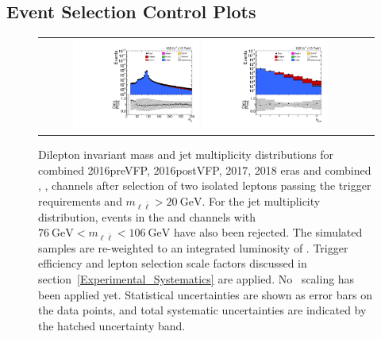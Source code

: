 \subsection{Event Selection Control Plots}
\begin{figure}[htb]
    \begin{center}
        \begin{tabular}{cc}
            \includegraphics[width=0.40\textwidth]{fig_fullRun2UL/controlplots/combined/DIMFull.pdf}
            \includegraphics[width=0.40\textwidth]{fig_fullRun2UL/controlplots/combined/HypjetMulti_diLep.pdf}
        \end{tabular}
        \caption{\footnotesize Dilepton invariant mass and jet multiplicity distributions for combined 2016preVFP, 2016postVFP, 2017, 2018 eras and combined \ee, \emu, \mumu channels after selection of two isolated leptons passing the trigger requirements and $m_{\ell\bar{\ell}} > \SI{20}{\GeV}$.
        For the jet multiplicity distribution, events in the \ee and \mumu channels with $\SI{76}{\GeV} < m_{\ell\bar{\ell}} < \SI{106}{\GeV}$ have also been rejected.
        The simulated samples are re-weighted to an integrated luminosity of \lumivalueRuniiUL.
        Trigger efficiency and lepton selection scale factors discussed in section~\ref{Experimental_Systematics} are applied.
        No \zjets\ scaling has been applied yet.
        Statistical uncertainties are shown as error bars on the data points, and total systematic uncertainties are indicated by the hatched uncertainty band.
        }
    \end{center}
\end{figure}

